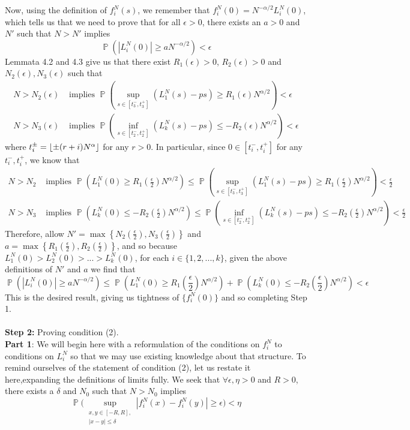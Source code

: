 \documentclass[12pt]{article}
\DeclareMathOperator{\pr}{\mathbb{P}}
\DeclarePairedDelimiter\floor{\lfloor}{\rfloor}
\begin{document}
Now, using the definition of $f_i^N(s)$, we remember that $f^N_i(0)=N^{-\alpha/2}L_i^N(0)$, which tells us that we need to prove that for all $\epsilon>0$, there exists an $a>0$ and $N'$ such that $N>N'$ implies 
$$\pr(|L_i^N(0)|\geq a N^{-\alpha/2})<\epsilon$$
Lemmata 4.2 and 4.3 give us that there exist $R_1(\epsilon)>0$, $R_2(\epsilon)>0$ and $N_2(\epsilon),N_3(\epsilon)$ such that 
\begin{align*}
N>N_2(\epsilon) &\text{ implies } \pr\left(\sup_{s\in[t_3^-,t_3^+]}\left(L_1^N(s)-ps\right)\geq R_1(\epsilon)N^{\alpha/2}\right)<\epsilon\\
N>N_3(\epsilon) &\text{ implies } \pr\left(\inf_{s\in[t_2^-,t_2^+]}\left(L_k^N(s)-ps\right)\leq -R_2(\epsilon)N^{\alpha/2}\right)<\epsilon
\end{align*}
where $t_i^\pm=\floor{\pm(r+i)N^\alpha}$ for any $r>0$. In particular, since $0\in[t_i^-,t_i^+]$ for any $t_i^-,t_i^+$, we know that 
\begin{align*}
N>N_2&\text{ implies }\pr\left(L_1^N(0)\geq R_1\left(\frac{\epsilon}{2}\right)N^{\alpha/2}\right)\leq \pr\left(\sup_{s\in[t_3^-,t_3^+]}\left(L_1^N(s)-ps\right)\geq R_1\left(\frac \epsilon 2\right)N^{\alpha/2}\right)<\frac\epsilon 2\\
N>N_3&\text{ implies }\pr\left(L_k^N(0)\leq -R_2\left(\frac{\epsilon}{2}\right)N^{\alpha/2}\right)\leq \pr\left(\inf_{s\in[t_2^-,t_2^+]}\left(L_k^N(s)-ps\right)\leq -R_2\left(\frac\epsilon 2\right)N^{\alpha/2}\right)<\frac \epsilon 2
\end{align*}
Therefore, allow $N'=\max\left\{N_2\left(\frac{\epsilon}{2}\right),N_3\left(\frac{\epsilon}{2}\right)\right\}$ and $a=\max\left\{R_1\left(\frac{\epsilon}{2}\right),R_2\left(\frac{\epsilon}{2}\right)\right\}$, and so because $L_1^N(0)>L_2^N(0)>...>L_k^N(0)$, for each $i\in \{1,2,...,k\}$, given the above definitions of $N'$ and $a$ we find that 
$$\pr(|L_i^N(0)|\geq a N^{-\alpha/2})\leq \pr\left(L_1^N(0)\geq R_1\left(\frac{\epsilon}{2}\right)N^{\alpha/2}\right)+\pr\left(L_k^N(0)\leq -R_2\left(\frac{\epsilon}{2}\right)N^{\alpha/2}\right)<\epsilon$$
This is the desired result, giving us tightness of $\{f_i^N(0)\}$ and so completing Step 1.\\\\\noindent
\textbf{Step 2:} Proving condition (2).\\
\textbf{Part 1}: 
We will begin here with a reformulation of the conditions on $f_i^N$ to conditions on $L_i^N$ so that we may use existing knowledge about that structure. To remind ourselves of the statement of condition (2), let us restate it here,expanding the definitions of limits fully. We seek that $\forall \epsilon,\eta>0$ and $R>0$, there exists a $\delta$ and $N_0$ such that $N>N_0$ implies 
\[
\pr\bigg(\sup_{\substack{x,y\in [-R,R],\\ |x-y|\leq\delta}} |f^N_i(x) - f^N_i(y)| \geq \epsilon\bigg)<\eta
\]
\end{document}
